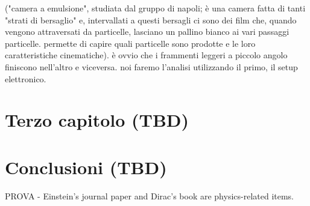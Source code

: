 \documentclass[12pt,a4paper,twoside]{report}
\begin{document}
	
	
	
	
	
	
	
	
	("camera a emulsione", studiata dal gruppo di napoli; è una camera fatta di tanti "strati di bersaglio" e, intervallati a questi bersagli ci sono dei film che, quando vengono attraversati da particelle, lasciano un pallino bianco ai vari passaggi particelle. permette di capire quali particelle sono prodotte e le loro caratteristiche cinematiche). è ovvio che i frammenti leggeri a piccolo angolo finiscono nell'altro e viceversa. noi faremo l'analisi utilizzando il primo, il setup elettronico.
	
	
	
	
	
	\chapter{Terzo capitolo (TBD)}
	
			
	\chapter*{Conclusioni (TBD)}
		PROVA - Einstein's journal paper \cite{einstein} and Dirac's book \cite{dirac} are physics-related items.
	\newpage	
	\printbibliography[
		heading=bibintoc,
		title={Bibliografia (TBD)}
		]
		 	
\end{document}
